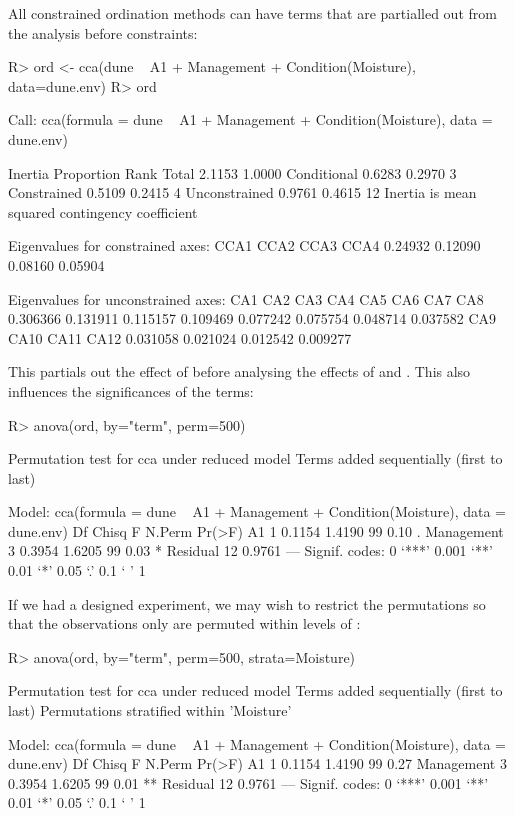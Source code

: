 \documentclass[article,nojss]{jss}
\begin{document}
All constrained ordination methods can have terms that are partialled
out from the analysis before constraints:
\begin{Schunk}
\begin{Sinput}
R> ord <- cca(dune ~ A1 + Management + Condition(Moisture), data=dune.env)
R> ord
\end{Sinput}
\begin{Soutput}
Call: cca(formula = dune ~ A1 + Management +
Condition(Moisture), data = dune.env)

              Inertia Proportion Rank
Total          2.1153     1.0000     
Conditional    0.6283     0.2970    3
Constrained    0.5109     0.2415    4
Unconstrained  0.9761     0.4615   12
Inertia is mean squared contingency coefficient 

Eigenvalues for constrained axes:
   CCA1    CCA2    CCA3    CCA4 
0.24932 0.12090 0.08160 0.05904 

Eigenvalues for unconstrained axes:
     CA1      CA2      CA3      CA4      CA5      CA6      CA7      CA8 
0.306366 0.131911 0.115157 0.109469 0.077242 0.075754 0.048714 0.037582 
     CA9     CA10     CA11     CA12 
0.031058 0.021024 0.012542 0.009277 
\end{Soutput}
\end{Schunk}
This partials out the effect of  before analysing the
effects of  and .  This also influences
the significances of the terms:
\begin{Schunk}
\begin{Sinput}
R> anova(ord, by="term", perm=500)
\end{Sinput}
\begin{Soutput}
Permutation test for cca under reduced model
Terms added sequentially (first to last)

Model: cca(formula = dune ~ A1 + Management + Condition(Moisture), data = dune.env)
           Df  Chisq      F N.Perm Pr(>F)  
A1          1 0.1154 1.4190     99   0.10 .
Management  3 0.3954 1.6205     99   0.03 *
Residual   12 0.9761                       
---
Signif. codes:  0 ‘***’ 0.001 ‘**’ 0.01 ‘*’ 0.05 ‘.’ 0.1 ‘ ’ 1 
\end{Soutput}
\end{Schunk}
If we had a designed experiment, we may wish to restrict the
permutations so that the observations only are permuted within levels
of :
\begin{Schunk}
\begin{Sinput}
R> anova(ord, by="term", perm=500, strata=Moisture)
\end{Sinput}
\begin{Soutput}
Permutation test for cca under reduced model
Terms added sequentially (first to last)
Permutations stratified within 'Moisture'

Model: cca(formula = dune ~ A1 + Management + Condition(Moisture), data = dune.env)
           Df  Chisq      F N.Perm Pr(>F)   
A1          1 0.1154 1.4190     99   0.27   
Management  3 0.3954 1.6205     99   0.01 **
Residual   12 0.9761                        
---
Signif. codes:  0 ‘***’ 0.001 ‘**’ 0.01 ‘*’ 0.05 ‘.’ 0.1 ‘ ’ 1 
\end{Soutput}
\end{Schunk}

\end{document}
